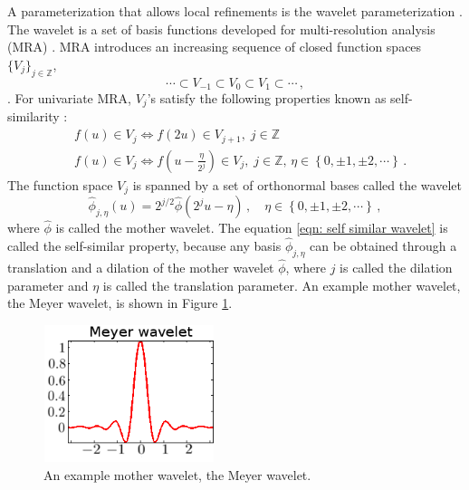 A parameterization that allows local refinements is the wavelet parameterization
\cite{wavelet mallat}.
The wavelet is a set of basis functions
developed for multi-resolution analysis (MRA) \cite{wavelet mallat}.
MRA introduces an increasing sequence of closed function spaces $\{V_j\}_{j\in \mathbb{Z}}$,
$$\cdots \subset V_{-1} \subset V_0 \subset V_1 \subset \cdots \,,$$
\cite{wavelet mallat}.
For univariate MRA, $V_j$'s satisfy the following properties known as
self-similarity \cite{wavelet mallat}:
\begin{equation*}\begin{split}
    &f(u) \in V_j \Leftrightarrow f(2u) \in V_{j+1}, \; j\in \mathbb{Z}\\
    &f(u) \in V_j \Leftrightarrow f(u-\frac{\eta}{2^j}) \in V_{j},
                    \; j\in \mathbb{Z},\, \eta\in \left\{0, \pm 1, \pm 2,\cdots\right\}\,.
\end{split}\end{equation*}
The function space $V_j$ is spanned by a set of orthonormal bases called the wavelet
\cite{wavelet mallat}
\begin{equation}
    \hat{\phi}_{j,\eta}(u) = 2^{j/2} \hat{\phi}(2^j u-\eta) \,,\quad 
    \eta\in \left\{0, \pm 1, \pm 2,\cdots\right\}\,,
    \label{eqn: self similar wavelet}
\end{equation}
where $\hat{\phi}$ is called the mother wavelet.
The equation \eqref{eqn: self similar wavelet} is called the self-similar property, 
because any basis $\hat{\phi}_{j,\eta}$ can be obtained through a translation and a dilation 
of the mother wavelet $\hat{\phi}$, where $j$ is called the dilation parameter and $\eta$
is called the translation parameter.
An example mother wavelet, the Meyer wavelet, is shown in Figure \ref{fig: meyer}.\\

\begin{figure}[Htbp]\begin{center}
    \includegraphics[width=5cm, height=4cm]{../meyer_2.png}
    \caption{An example mother wavelet, the Meyer wavelet.}
    \label{fig: meyer}
\end{center}\end{figure}

